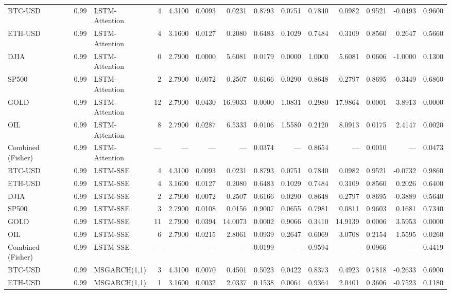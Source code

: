 \begin{table}[ht]
\begin{tabular}{lllrrrrrrrrrrr}
BTC-USD & 0.99 & LSTM-Attention & 4 & 4.3100 & 0.0093 & 0.0231 & 0.8793 & 0.0751 & 0.7840 & 0.0982 & 0.9521 & -0.0493 & 0.9600 \\
ETH-USD & 0.99 & LSTM-Attention & 4 & 3.1600 & 0.0127 & 0.2080 & 0.6483 & 0.1029 & 0.7484 & 0.3109 & 0.8560 & 0.2647 & 0.5660 \\
DJIA & 0.99 & LSTM-Attention & 0 & 2.7900 & 0.0000 & 5.6081 & 0.0179 & 0.0000 & 1.0000 & 5.6081 & 0.0606 & -1.0000 & 0.1300 \\
SP500 & 0.99 & LSTM-Attention & 2 & 2.7900 & 0.0072 & 0.2507 & 0.6166 & 0.0290 & 0.8648 & 0.2797 & 0.8695 & -0.3449 & 0.6860 \\
GOLD & 0.99 & LSTM-Attention & 12 & 2.7900 & 0.0430 & 16.9033 & 0.0000 & 1.0831 & 0.2980 & 17.9864 & 0.0001 & 3.8913 & 0.0000 \\
OIL & 0.99 & LSTM-Attention & 8 & 2.7900 & 0.0287 & 6.5333 & 0.0106 & 1.5580 & 0.2120 & 8.0913 & 0.0175 & 2.4147 & 0.0020 \\
Combined (Fisher) & 0.99 & LSTM-Attention & — & — & — & — & 0.0374 & — & 0.8654 & — & 0.0010 & — & 0.0473 \\
BTC-USD & 0.99 & LSTM-SSE & 4 & 4.3100 & 0.0093 & 0.0231 & 0.8793 & 0.0751 & 0.7840 & 0.0982 & 0.9521 & -0.0732 & 0.9860 \\
ETH-USD & 0.99 & LSTM-SSE & 4 & 3.1600 & 0.0127 & 0.2080 & 0.6483 & 0.1029 & 0.7484 & 0.3109 & 0.8560 & 0.2026 & 0.6400 \\
DJIA & 0.99 & LSTM-SSE & 2 & 2.7900 & 0.0072 & 0.2507 & 0.6166 & 0.0290 & 0.8648 & 0.2797 & 0.8695 & -0.3889 & 0.5640 \\
SP500 & 0.99 & LSTM-SSE & 3 & 2.7900 & 0.0108 & 0.0156 & 0.9007 & 0.0655 & 0.7981 & 0.0811 & 0.9603 & 0.1681 & 0.7340 \\
GOLD & 0.99 & LSTM-SSE & 11 & 2.7900 & 0.0394 & 14.0073 & 0.0002 & 0.9066 & 0.3410 & 14.9139 & 0.0006 & 3.5953 & 0.0000 \\
OIL & 0.99 & LSTM-SSE & 6 & 2.7900 & 0.0215 & 2.8061 & 0.0939 & 0.2647 & 0.6069 & 3.0708 & 0.2154 & 1.5595 & 0.0260 \\
Combined (Fisher) & 0.99 & LSTM-SSE & — & — & — & — & 0.0199 & — & 0.9594 & — & 0.0966 & — & 0.4419 \\
BTC-USD & 0.99 & MSGARCH(1,1) & 3 & 4.3100 & 0.0070 & 0.4501 & 0.5023 & 0.0422 & 0.8373 & 0.4923 & 0.7818 & -0.2633 & 0.6900 \\
ETH-USD & 0.99 & MSGARCH(1,1) & 1 & 3.1600 & 0.0032 & 2.0337 & 0.1538 & 0.0064 & 0.9364 & 2.0401 & 0.3606 & -0.7523 & 0.1180 \\

\end{tabular}
\end{table}
